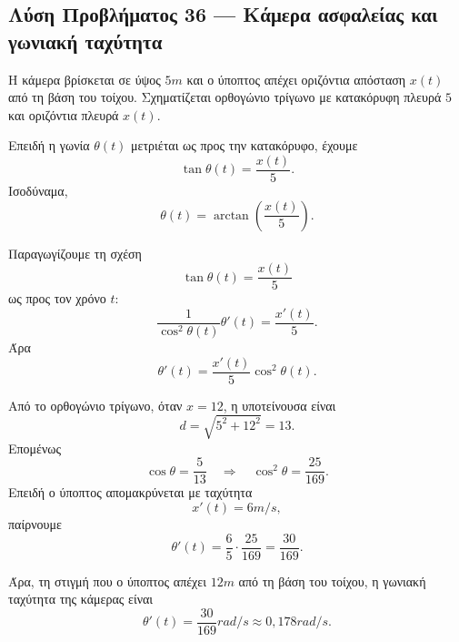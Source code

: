 \subsection*{Λύση Προβλήματος 36 --- Κάμερα ασφαλείας και γωνιακή ταχύτητα}

\begin{alist}
  \item Η κάμερα βρίσκεται σε ύψος $5\si{m}$ και ο ύποπτος απέχει
        οριζόντια απόσταση $x(t)$ από τη βάση του τοίχου. Σχηματίζεται
        ορθογώνιο τρίγωνο με κατακόρυφη πλευρά $5$ και οριζόντια πλευρά
        $x(t)$.

        Επειδή η γωνία $\theta(t)$ μετριέται ως προς την κατακόρυφο,
        έχουμε
        \[
          \tan\theta(t)=\frac{x(t)}{5}.
        \]
        Ισοδύναμα,
        \[
          {\theta(t)=\arctan\left(\frac{x(t)}{5}\right)}.
        \]

  \item Παραγωγίζουμε τη σχέση
        \[
          \tan\theta(t)=\frac{x(t)}{5}
        \]
        ως προς τον χρόνο $t$:
        \[
          \frac{1}{\cos^2\theta(t)}\theta'(t)
          =
          \frac{x'(t)}{5}.
        \]
        Άρα
        \[
          \theta'(t)
          =
          \frac{x'(t)}{5}\cos^2\theta(t).
        \]

        Από το ορθογώνιο τρίγωνο, όταν $x=12$, η υποτείνουσα είναι
        \[
          d=\sqrt{5^2+12^2}=13.
        \]
        Επομένως
        \[
          \cos\theta=\frac{5}{13}
          \quad\Rightarrow\quad
          \cos^2\theta=\frac{25}{169}.
        \]
        Επειδή ο ύποπτος απομακρύνεται με ταχύτητα
        \[
          x'(t)=6\si{m/s},
        \]
        παίρνουμε
        \[
          \theta'(t)
          =
          \frac{6}{5}\cdot\frac{25}{169}
          =
          \frac{30}{169}.
        \]

        Άρα, τη στιγμή που ο ύποπτος απέχει $12\si{m}$ από τη βάση του
        τοίχου, η γωνιακή ταχύτητα της κάμερας είναι
        \[
          {\theta'(t)=\frac{30}{169}\si{rad/s}
          \approx0{,}178\si{rad/s}}.
        \]
\end{alist}
